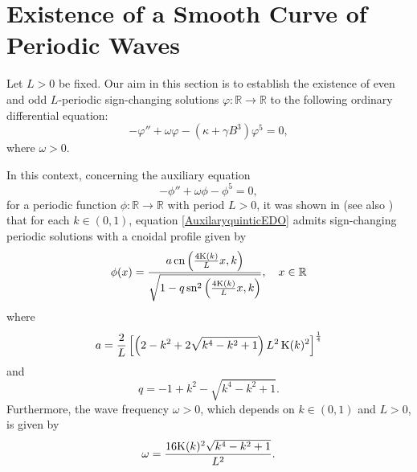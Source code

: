 \documentclass[10pt,reqno,a4paper]{amsart} %
\theoremstyle{definition} %
\numberwithin{equation}{section}
\numberwithin{figure}{section}
\begin{document}
\vspace{0.5cm}
\section{Existence of a Smooth Curve of Periodic Waves}\label{SectionExistenceSolutions}

Let $L>0$ be fixed. Our aim in this section is to establish the existence of even and odd $L$-periodic sign-changing solutions $\varphi : \mathbb{R} \to \mathbb{R}$ to the following ordinary differential equation:
\begin{equation}\label{mainEDOquinticsystem}
	-\varphi''+\omega \varphi -(\kappa+\gamma B^3)\varphi^5=0,
\end{equation}
where $\omega>0$.

In this context, concerning the auxiliary equation
\begin{equation}\label{AuxilaryquinticEDO}
	- \phi'' + \omega \phi - \phi^5 = 0,
\end{equation}
for a periodic function $\phi: \mathbb{R} \to \mathbb{R}$ with period $L > 0$, it was shown in \cite[Section 4.3]{NataliCardosoAmaral} (see also \cite{BittencourtLoreno2022}) that for each $k \in (0,1)$, equation \eqref{AuxilaryquinticEDO} admits sign-changing periodic solutions with a cnoidal profile given by
\begin{equation}\label{cnoidalsolution}
	\phi(x) = \frac{a \, \text{cn} \left( \frac{4{\rm K}(k)}{L} x, k \right)}{\sqrt{1 - q \, \text{sn}^2 \left( \frac{4{\rm K}(k)}{L} x, k \right)}}, \quad x \in \mathbb{R}
\end{equation}
where
\begin{equation}\label{avaleuCnoidal}
	a = \frac{2}{L} \left[ \left( 2 - k^2 + 2 \sqrt{k^4 - k^2 + 1}\right) L^2 \, {\rm K}(k)^2 \right]^{\frac{1}{4}}
\end{equation}
and
\begin{equation}\label{qvaleuCnoidal}
	q = -1 + k^2 - \sqrt{k^4 - k^2 + 1}.
\end{equation}
Furthermore, the wave frequency $\omega>0$, which depends on $k \in (0,1)$ and $L>0$, is given by
\begin{eqnarray}\label{valuewCnoidal}
	\omega =  \frac{16{\rm K}(k)^2 \sqrt{k^4 - k^2 +1 }}{L^2}.
\end{eqnarray}
\end{document}
